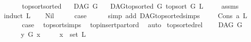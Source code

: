 \begin{isabellebody}
\ \ \isamarkupfalse%
\ \isanewline
{}\isamarkupfalse%
%
\endisatagproof
{\isafoldproof}%
%
\isadelimproof
\isanewline
%
\endisadelimproof
\isanewline
\isanewline
{}\isamarkupfalse%
\ top{\isacharunderscore}{\kern0pt}sort{\isacharunderscore}{\kern0pt}sorted{\isacharcolon}{\kern0pt}\isanewline
\ \ \ {\isachardoublequoteopen}DAG\ G{\isachardoublequoteclose}\isanewline
\ \ \ {\isachardoublequoteopen}DAG{\isachardot}{\kern0pt}top{\isacharunderscore}{\kern0pt}sorted\ G\ {\isacharparenleft}{\kern0pt}top{\isacharunderscore}{\kern0pt}sort\ G\ L{\isacharparenright}{\kern0pt}{\isachardoublequoteclose}\ \isanewline
%
\isadelimproof
\ \ %
\endisadelimproof
%
\isatagproof
{}\isamarkupfalse%
\ assms\ \isanewline
{}\isamarkupfalse%
{\isacharparenleft}{\kern0pt}induct\ L{\isacharparenright}{\kern0pt}\isanewline
\ \ \isamarkupfalse%
\ Nil\isanewline
\ \ \isamarkupfalse%
\ \isamarkupfalse%
\ {\isacharquery}{\kern0pt}case\isanewline
\ \ \ \ \isamarkupfalse%
\ {\isacharparenleft}{\kern0pt}simp\ add{\isacharcolon}{\kern0pt}\ DAG{\isachardot}{\kern0pt}top{\isacharunderscore}{\kern0pt}sorted{\isachardot}{\kern0pt}simps{\isacharparenleft}{\kern0pt}{}{\isacharparenright}{\kern0pt}{\isacharparenright}{\kern0pt}\ \isanewline
\ \ \isamarkupfalse%
\ {\isacharparenleft}{\kern0pt}Cons\ a\ L{\isacharparenright}{\kern0pt}\isanewline
\ \ \isamarkupfalse%
\ \isamarkupfalse%
\ {\isacharquery}{\kern0pt}case\ \isamarkupfalse%
\ top{\isacharunderscore}{\kern0pt}sort{\isachardot}{\kern0pt}simps\ \isamarkupfalse%
\ top{\isacharunderscore}{\kern0pt}insert{\isacharunderscore}{\kern0pt}part{\isacharunderscore}{\kern0pt}ord\ \isamarkupfalse%
\ auto\isanewline
{}\isamarkupfalse%
%
\endisatagproof
{\isafoldproof}%
%
\isadelimproof
\isanewline
%
\endisadelimproof
\isanewline
{}\isamarkupfalse%
\ top{\isacharunderscore}{\kern0pt}sorted{\isacharunderscore}{\kern0pt}rel{\isacharcolon}{\kern0pt}\ \isanewline
\ \ \ {\isachardoublequoteopen}DAG\ G{\isachardoublequoteclose}\isanewline
\ \ \ \ \ {\isachardoublequoteopen}y\ {\isasymrightarrow}\isactrlsup {\isacharplus}{\kern0pt}\isactrlbsub G\isactrlesub \ x{\isachardoublequoteclose}\isanewline
\ \ \ \ \ {\isachardoublequoteopen}x\ {\isasymin}\ set\ L{\isachardoublequoteclose}\isanewline

\end{isabellebody}
